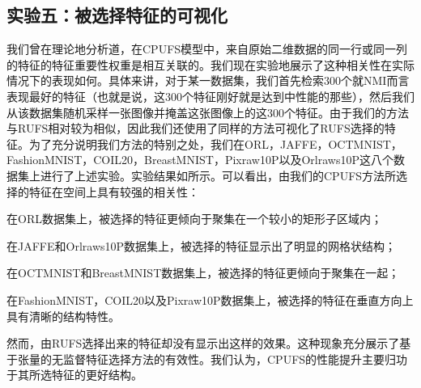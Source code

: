 \subsection{实验五：被选择特征的可视化}
我们曾在理论地分析道，在CPUFS模型中，来自原始二维数据的同一行或同一列的特征的特征重要性权重是相互关联的。我们现在实验地展示了这种相关性在实际情况下的表现如何。具体来讲，对于某一数据集，我们首先检索$300$个就NMI而言表现最好的特征（也就是说，这$300$个特征刚好就是达到中性能的那些），然后我们从该数据集随机采样一张图像并掩盖这张图像上的这$300$个特征。由于我们的方法与RUFS相对较为相似，因此我们还使用了同样的方法可视化了RUFS选择的特征。为了充分说明我们方法的特别之处，我们在ORL，JAFFE，OCTMNIST，FashionMNIST，COIL20，BreastMNIST，Pixraw10P以及Orlraws10P这八个数据集上进行了上述实验。实验结果如所示。可以看出，由我们的CPUFS方法所选择的特征在空间上具有较强的相关性：
\begin{enumerate*}
    \item 在ORL数据集上，被选择的特征更倾向于聚集在一个较小的矩形子区域内；
    \item 在JAFFE和Orlraws10P数据集上，被选择的特征显示出了明显的网格状结构；
    \item 在OCTMNIST和BreastMNIST数据集上，被选择的特征更倾向于聚集在一起；
    \item 在FashionMNIST，COIL20以及Pixraw10P数据集上，被选择的特征在垂直方向上具有清晰的结构特性。
\end{enumerate*}
然而，由RUFS选择出来的特征却没有显示出这样的效果。这种现象充分展示了基于张量的无监督特征选择方法的有效性。我们认为，CPUFS的性能提升主要归功于其所选特征的更好结构。

